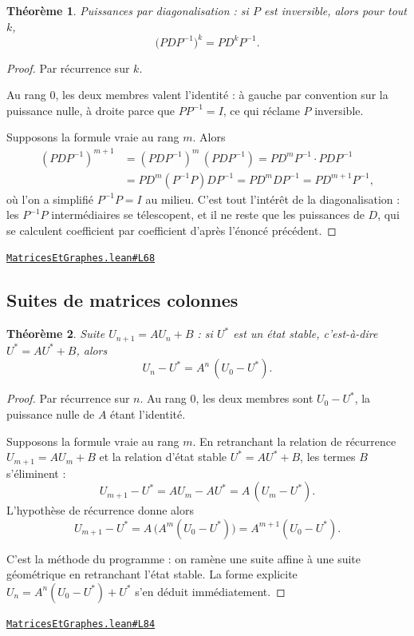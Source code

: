 \documentclass[11pt,a4paper]{article}
\theoremstyle{definition}
\theoremstyle{plain}
\newtheorem{theoreme}{Théorème}
\newcommand{\source}[2]{\par\smallskip\noindent\hfill{\footnotesize\href{#1}{\texttt{#2}}}\par\smallskip}
\begin{document}
\begin{theoreme}
Puissances par diagonalisation : si $P$ est inversible, alors pour tout $k$,
\[ \bigl(PDP^{-1}\bigr)^{k} = P D^{k} P^{-1} . \]
\end{theoreme}

\begin{proof}
Par récurrence sur $k$.

Au rang $0$, les deux membres valent l'identité : à gauche par convention sur la puissance
nulle, à droite parce que $PP^{-1} = I$, ce qui réclame $P$ inversible.

Supposons la formule vraie au rang $m$. Alors
\begin{align*}
  (PDP^{-1})^{m+1} &= (PDP^{-1})^{m}\,(PDP^{-1}) = P D^{m} P^{-1} \cdot P D P^{-1} \\
   &= P D^{m} (P^{-1}P) D P^{-1} = P D^{m} D P^{-1} = P D^{m+1} P^{-1} ,
\end{align*}
où l'on a simplifié $P^{-1}P = I$ au milieu. C'est tout l'intérêt de la diagonalisation :
les $P^{-1}P$ intermédiaires se télescopent, et il ne reste que les puissances de $D$, qui
se calculent coefficient par coefficient d'après l'énoncé précédent.
\end{proof}
\source{https://github.com/Commutator-IO/learn-lean/blob/main/courses/02-lycee/10-specialite-mathematiques-terminale-s/MatricesEtGraphes.lean\#L68}{MatricesEtGraphes.lean\#L68}

\subsection{Suites de matrices colonnes}

\begin{theoreme}
Suite $U_{n+1} = AU_n + B$ : si $U^{*}$ est un état stable, c'est-à-dire
$U^{*} = AU^{*} + B$, alors
\[ U_n - U^{*} = A^{n}\,(U_0 - U^{*}) . \]
\end{theoreme}

\begin{proof}
Par récurrence sur $n$. Au rang $0$, les deux membres sont $U_0 - U^{*}$, la puissance
nulle de $A$ étant l'identité.

Supposons la formule vraie au rang $m$. En retranchant la relation de récurrence
$U_{m+1} = AU_m + B$ et la relation d'état stable $U^{*} = AU^{*} + B$, les termes $B$
s'éliminent :
\[ U_{m+1} - U^{*} = A U_m - A U^{*} = A\,(U_m - U^{*}) . \]
L'hypothèse de récurrence donne alors
\[ U_{m+1} - U^{*} = A\,\bigl(A^{m}(U_0 - U^{*})\bigr) = A^{m+1}(U_0 - U^{*}) . \]

\medskip\noindent
C'est la méthode du programme : on ramène une suite affine à une suite géométrique en
retranchant l'état stable. La forme explicite $U_n = A^{n}(U_0 - U^{*}) + U^{*}$ s'en
déduit immédiatement.
\end{proof}
\source{https://github.com/Commutator-IO/learn-lean/blob/main/courses/02-lycee/10-specialite-mathematiques-terminale-s/MatricesEtGraphes.lean\#L84}{MatricesEtGraphes.lean\#L84}
\end{document}
